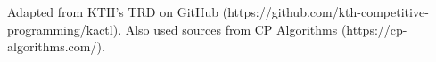 \documentclass[9pt, a4paper, notitlepage]{extreport}
\begin{document}
	Adapted from KTH's TRD on GitHub (https://github.com/kth-competitive-programming/kactl). Also used sources from CP Algorithms (https://cp-algorithms.com/). 
	\begin{multicols*}{3}
	\thispagestyle{fancy}
	\setcounter{tocdepth}{1}
	\tableofcontents

	\end{multicols*}

	\begin{multicols*}{3}
	\end{multicols*}
\end{document}
